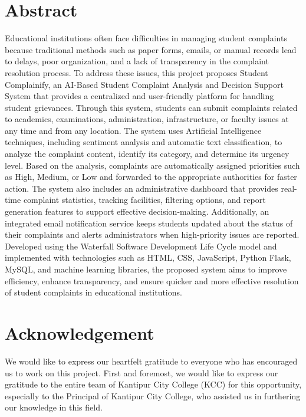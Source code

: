 \documentclass[12pt,a4paper]{report}
\begin{document}
\chapter*{Abstract}

Educational institutions often face difficulties in managing student complaints because traditional methods such as paper forms, emails, or manual records lead to delays, poor organization, and a lack of transparency in the complaint resolution process. To address these issues, this project proposes Student Complainify, an AI-Based Student Complaint Analysis and Decision Support System that provides a centralized and user-friendly platform for handling student grievances. Through this system, students can submit complaints related to academics, examinations, administration, infrastructure, or faculty issues at any time and from any location. The system uses Artificial Intelligence techniques, including sentiment analysis and automatic text classification, to analyze the complaint content, identify its category, and determine its urgency level. Based on the analysis, complaints are automatically assigned priorities such as High, Medium, or Low and forwarded to the appropriate authorities for faster action. The system also includes an administrative dashboard that provides real-time complaint statistics, tracking facilities, filtering options, and report generation features to support effective decision-making. Additionally, an integrated email notification service keeps students updated about the status of their complaints and alerts administrators when high-priority issues are reported. Developed using the Waterfall Software Development Life Cycle model and implemented with technologies such as HTML, CSS, JavaScript, Python Flask, MySQL, and machine learning libraries, the proposed system aims to improve efficiency, enhance transparency, and ensure quicker and more effective resolution of student complaints in educational institutions.

\chapter*{Acknowledgement}

We would like to express our heartfelt gratitude to everyone who has encouraged us to work on this project. First and foremost, we would like to express our gratitude to the entire team of Kantipur City College (KCC) for this opportunity, especially to the Principal of Kantipur City College, who assisted us in furthering our knowledge in this field.
\end{document}
